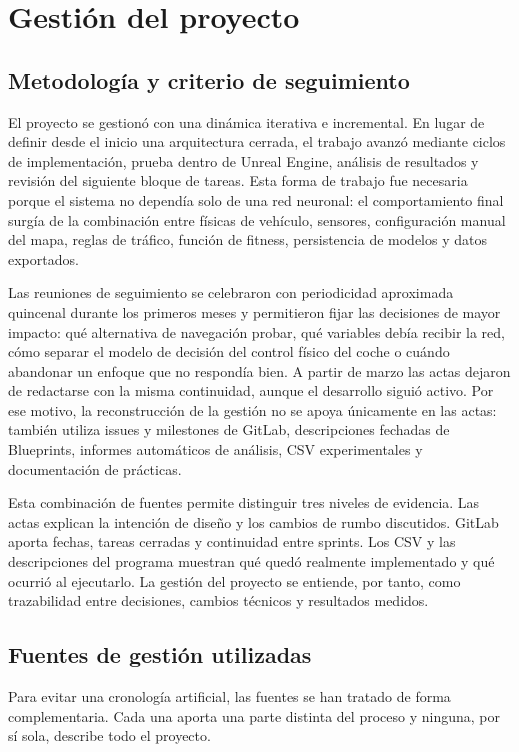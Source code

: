 \chapter{Gestión del proyecto}

\section{Metodología y criterio de seguimiento}

El proyecto se gestionó con una dinámica iterativa e incremental. En lugar de definir desde el inicio una arquitectura cerrada, el trabajo avanzó mediante ciclos de implementación, prueba dentro de Unreal Engine, análisis de resultados y revisión del siguiente bloque de tareas. Esta forma de trabajo fue necesaria porque el sistema no dependía solo de una red neuronal: el comportamiento final surgía de la combinación entre físicas de vehículo, sensores, configuración manual del mapa, reglas de tráfico, función de fitness, persistencia de modelos y datos exportados.

Las reuniones de seguimiento se celebraron con periodicidad aproximada quincenal durante los primeros meses y permitieron fijar las decisiones de mayor impacto: qué alternativa de navegación probar, qué variables debía recibir la red, cómo separar el modelo de decisión del control físico del coche o cuándo abandonar un enfoque que no respondía bien. A partir de marzo las actas dejaron de redactarse con la misma continuidad, aunque el desarrollo siguió activo. Por ese motivo, la reconstrucción de la gestión no se apoya únicamente en las actas: también utiliza issues y milestones de GitLab, descripciones fechadas de Blueprints, informes automáticos de análisis, CSV experimentales y documentación de prácticas.

Esta combinación de fuentes permite distinguir tres niveles de evidencia. Las actas explican la intención de diseño y los cambios de rumbo discutidos. GitLab aporta fechas, tareas cerradas y continuidad entre sprints. Los CSV y las descripciones del programa muestran qué quedó realmente implementado y qué ocurrió al ejecutarlo. La gestión del proyecto se entiende, por tanto, como trazabilidad entre decisiones, cambios técnicos y resultados medidos.

\clearpage
\section{Fuentes de gestión utilizadas}

Para evitar una cronología artificial, las fuentes se han tratado de forma complementaria. Cada una aporta una parte distinta del proceso y ninguna, por sí sola, describe todo el proyecto.

